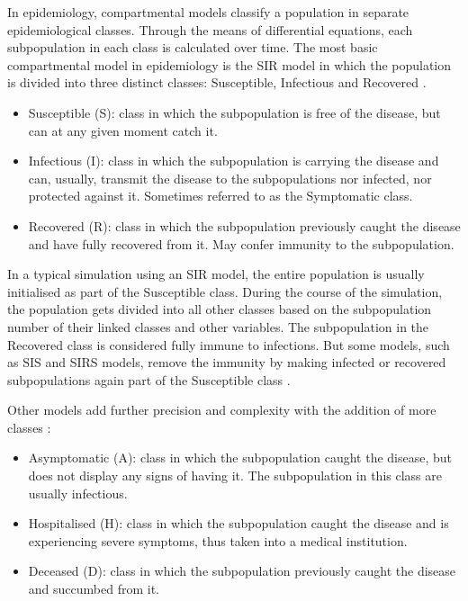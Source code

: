 In epidemiology, compartmental models classify a population in separate epidemiological classes. Through the means of differential equations, each subpopulation in each class is calculated over time. The most basic compartmental model in epidemiology is the SIR model in which the population is divided into three distinct classes: Susceptible, Infectious and Recovered \cite{hethcote_mathematics_2000, wiratsudakul_dynamics_2018}.

\begin{itemize}
    \item Susceptible (S): class in which the subpopulation is free of the disease, but can at any given moment catch it.
    \item Infectious (I): class in which the subpopulation is carrying the disease and can, usually, transmit the disease to the subpopulations nor infected, nor protected against it. Sometimes referred to as the Symptomatic class.
    \item Recovered (R): class in which the subpopulation previously caught the disease and have fully recovered from it. May confer immunity to the subpopulation.
\end{itemize}

In a typical simulation using an SIR model, the entire population is usually initialised as part of the Susceptible class. During the course of the simulation, the population gets divided into all other classes based on the subpopulation number of their linked classes and other variables. The subpopulation in the Recovered class is considered fully immune to infections. But some models, such as SIS and SIRS models, remove the immunity by making infected or recovered subpopulations again part of the Susceptible class \cite{hethcote_sis_1995, van_den_driessche_simple_2000}.

Other models add further precision and complexity with the addition of more classes \cite{dunham2005, almeida_epidemiological_2019, arenas_mathematical_2020, hove-musekwa_dynamics_2009}:
\begin{itemize}
    \item Asymptomatic (A): class in which the subpopulation caught the disease, but does not display any signs of having it. The subpopulation in this class are usually infectious.
    \item Hospitalised (H): class in which the subpopulation caught the disease and is experiencing severe symptoms, thus taken into a medical institution.
    \item Deceased (D): class in which the subpopulation previously caught the disease and succumbed from it.
\end{itemize}

